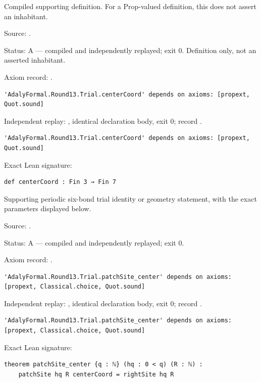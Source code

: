 \begin{definition}[bp-347]
\label{bp-347}
\uses{}
\leanok
Compiled supporting definition. For a Prop-valued definition, this does not assert an inhabitant.

\par Source: \texttt{}.
\par Status: A — compiled and independently replayed; exit 0. Definition only, not an asserted inhabitant.
\par Axiom record: \texttt{}.
\begin{verbatim}
'AdalyFormal.Round13.Trial.centerCoord' depends on axioms: [propext, Quot.sound]
\end{verbatim}
\par Independent replay: \texttt{}, identical declaration body, exit 0; record \texttt{}.
\begin{verbatim}
'AdalyFormal.Round13.Trial.centerCoord' depends on axioms: [propext, Quot.sound]
\end{verbatim}
\par Exact Lean signature:
\begin{verbatim}
def centerCoord : Fin 3 → Fin 7
\end{verbatim}
\end{definition}

\begin{theorem}[bp-348]
\label{bp-348}
\leanok
Supporting periodic six-bond trial identity or geometry statement, with the exact parameters displayed below.

\par Source: \texttt{}.
\par Status: A — compiled and independently replayed; exit 0.
\par Axiom record: \texttt{}.
\begin{verbatim}
'AdalyFormal.Round13.Trial.patchSite_center' depends on axioms: [propext, Classical.choice, Quot.sound]
\end{verbatim}
\par Independent replay: \texttt{}, identical declaration body, exit 0; record \texttt{}.
\begin{verbatim}
'AdalyFormal.Round13.Trial.patchSite_center' depends on axioms: [propext, Classical.choice, Quot.sound]
\end{verbatim}
\par Exact Lean signature:
\begin{verbatim}
theorem patchSite_center {q : ℕ} (hq : 0 < q) (R : ℕ) :
    patchSite hq R centerCoord = rightSite hq R
\end{verbatim}
\end{theorem}

